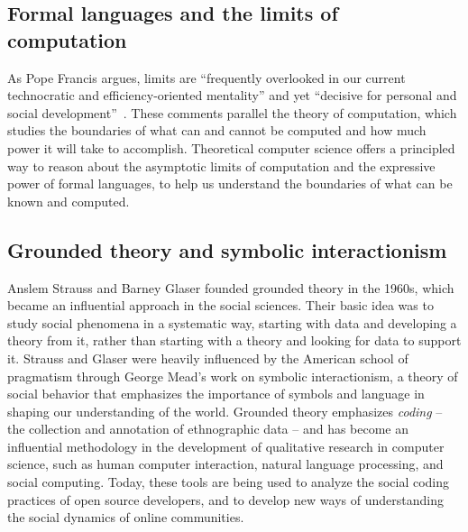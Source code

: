 \documentclass[sigplan,nonacm]{acmart}\settopmatter{printfolios=false,printccs=false,printacmref=false}
\begin{document}
\subsection{Formal languages and the limits of computation}

As Pope Francis argues, limits are ``frequently overlooked in our current technocratic and efficiency-oriented mentality'' and yet ``decisive for personal and social development''~\cite{catholic2024message}. These comments parallel the theory of computation, which studies the boundaries of what can and cannot be computed and how much power it will take to accomplish. Theoretical computer science offers a principled way to reason about the asymptotic limits of computation and the expressive power of formal languages, to help us understand the boundaries of what can be known and computed.


\subsection{Grounded theory and symbolic interactionism}

Anslem Strauss and Barney Glaser founded grounded theory in the 1960s, which became an influential approach in the social sciences. Their basic idea was to study social phenomena in a systematic way, starting with data and developing a theory from it, rather than starting with a theory and looking for data to support it. Strauss and Glaser were heavily influenced by the American school of pragmatism through George Mead's work on symbolic interactionism, a theory of social behavior that emphasizes the importance of symbols and language in shaping our understanding of the world. Grounded theory emphasizes \textit{coding} -- the collection and annotation of ethnographic data -- and has become an influential methodology in the development of qualitative research in computer science, such as human computer interaction, natural language processing, and social computing. Today, these tools are being used to analyze the social coding practices of open source developers, and to develop new ways of understanding the social dynamics of online communities.
\end{document}
